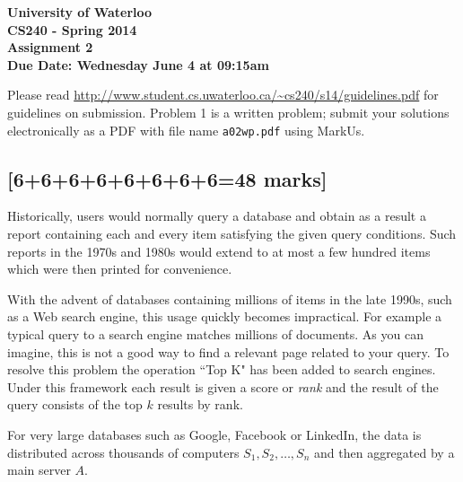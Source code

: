 \documentclass[12pt]{article}
\begin{document}
\begin{center}
{\Large\bf University of Waterloo}\\
\vspace{3mm}
{\Large\bf CS240 - Spring 2014}\\
\vspace{2mm}
{\Large\bf Assignment 2}\\
\vspace{3mm}
\textbf{Due Date: Wednesday June 4 at 09:15am}
\end{center}

\def\question#1{\item[\bf #1.]}
\def\part#1{\item[\bf #1)]}
\newcommand{\pc}[1]{\mbox{\textbf{#1}}} %

Please read
\url{http://www.student.cs.uwaterloo.ca/~cs240/s14/guidelines.pdf}
for guidelines on submission.
Problem 1 is a written
problem; submit your solutions electronically as a PDF with file name {\tt a02wp.pdf} using MarkUs.

\subsection{[6+6+6+6+6+6+6+6=48 marks]}
Historically, users would normally query a database and obtain as a result a report
containing each and every item satisfying the given query conditions. Such reports
in the 1970s and 1980s would extend to at most a few hundred items which were
then printed for convenience.

With the advent of databases containing millions
of items in the late 1990s, such as a Web search engine, this usage quickly becomes impractical.
For example a typical query to a search engine matches millions of documents.
As you can imagine, this is not a good way to find a relevant page related to
your query. To resolve this problem the operation ``Top K" has been added
to search engines. Under this framework each result is given a score or {\it rank}
and the result of the query consists of the top $k$ results by rank.

For very large databases such as Google, Facebook or LinkedIn, the data
is distributed across thousands of computers $S_1, S_2,\ldots, S_n$ and then aggregated by a main
server $A$.
\end{document}
